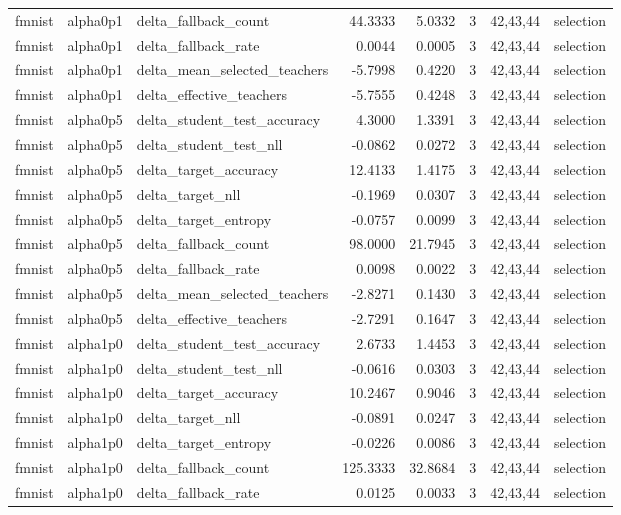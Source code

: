 \begin{tabular}{lllrrrll}
fmnist & alpha0p1 & delta\_fallback\_count & 44.3333 & 5.0332 & 3 & 42,43,44 & selection \\
fmnist & alpha0p1 & delta\_fallback\_rate & 0.0044 & 0.0005 & 3 & 42,43,44 & selection \\
fmnist & alpha0p1 & delta\_mean\_selected\_teachers & -5.7998 & 0.4220 & 3 & 42,43,44 & selection \\
fmnist & alpha0p1 & delta\_effective\_teachers & -5.7555 & 0.4248 & 3 & 42,43,44 & selection \\
fmnist & alpha0p5 & delta\_student\_test\_accuracy & 4.3000 & 1.3391 & 3 & 42,43,44 & selection \\
fmnist & alpha0p5 & delta\_student\_test\_nll & -0.0862 & 0.0272 & 3 & 42,43,44 & selection \\
fmnist & alpha0p5 & delta\_target\_accuracy & 12.4133 & 1.4175 & 3 & 42,43,44 & selection \\
fmnist & alpha0p5 & delta\_target\_nll & -0.1969 & 0.0307 & 3 & 42,43,44 & selection \\
fmnist & alpha0p5 & delta\_target\_entropy & -0.0757 & 0.0099 & 3 & 42,43,44 & selection \\
fmnist & alpha0p5 & delta\_fallback\_count & 98.0000 & 21.7945 & 3 & 42,43,44 & selection \\
fmnist & alpha0p5 & delta\_fallback\_rate & 0.0098 & 0.0022 & 3 & 42,43,44 & selection \\
fmnist & alpha0p5 & delta\_mean\_selected\_teachers & -2.8271 & 0.1430 & 3 & 42,43,44 & selection \\
fmnist & alpha0p5 & delta\_effective\_teachers & -2.7291 & 0.1647 & 3 & 42,43,44 & selection \\
fmnist & alpha1p0 & delta\_student\_test\_accuracy & 2.6733 & 1.4453 & 3 & 42,43,44 & selection \\
fmnist & alpha1p0 & delta\_student\_test\_nll & -0.0616 & 0.0303 & 3 & 42,43,44 & selection \\
fmnist & alpha1p0 & delta\_target\_accuracy & 10.2467 & 0.9046 & 3 & 42,43,44 & selection \\
fmnist & alpha1p0 & delta\_target\_nll & -0.0891 & 0.0247 & 3 & 42,43,44 & selection \\
fmnist & alpha1p0 & delta\_target\_entropy & -0.0226 & 0.0086 & 3 & 42,43,44 & selection \\
fmnist & alpha1p0 & delta\_fallback\_count & 125.3333 & 32.8684 & 3 & 42,43,44 & selection \\
fmnist & alpha1p0 & delta\_fallback\_rate & 0.0125 & 0.0033 & 3 & 42,43,44 & selection \\

\end{tabular}
